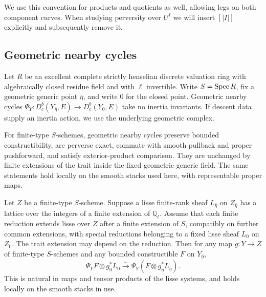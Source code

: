 We use this convention for products and quotients as well, allowing
legs on both component curves.  When studying perversity over $U^I$
we will insert $[|I|]$ explicitly and subsequently remove it.

\subsection{Geometric nearby cycles}

Let $R$ be an excellent complete strictly henselian discrete valuation
ring with algebraically closed residue field and with $\ell$ invertible.
Write $S=\operatorname{Spec} R$, fix a geometric generic point $\bar\eta$, and write
$0$ for the closed point.  Geometric nearby cycles
$\Psi_Y:D^b_c(Y_{\bar\eta},E)\to D^b_c(Y_0,E)$ take no inertia
invariants.  If descent data supply an inertia action, we use the
underlying geometric complex.

\begin{proposition}\label{found:nearby}
For finite-type $S$-schemes, geometric nearby cycles preserve bounded
constructibility, are perverse exact, commute with smooth pullback and
proper pushforward, and satisfy exterior-product comparison.  They are
unchanged by finite extensions of the trait inside the fixed geometric
generic field.  The same statements hold locally on the smooth stacks
used here, with representable proper maps.

Let $Z$ be a finite-type $S$-scheme.  Suppose a lisse finite-rank sheaf
$L_{\bar\eta}$ on $Z_{\bar\eta}$ has
a lattice over the integers of a finite extension of $\mathbb Q_\ell$.
Assume that each finite reduction extends lisse over $Z$ after a finite
extension of $S$, compatibly on further common extensions, with special
reductions belonging to a fixed lisse sheaf $L_0$ on $Z_0$.  The trait
extension may depend on the reduction.  Then for any map $g:Y\to Z$
of finite-type $S$-schemes and any bounded constructible $F$ on $Y_{\bar\eta}$,
\begin{equation}\label{found:lattice}
 \Psi_YF\otimes g_0^*L_0
      \xrightarrow{\sim}
       \Psi_Y(F\otimes g_{\bar\eta}^*L_{\bar\eta}).
\end{equation}
This is natural in maps and tensor products of the lisse systems, and
holds locally on the smooth stacks in use.
\end{proposition}

